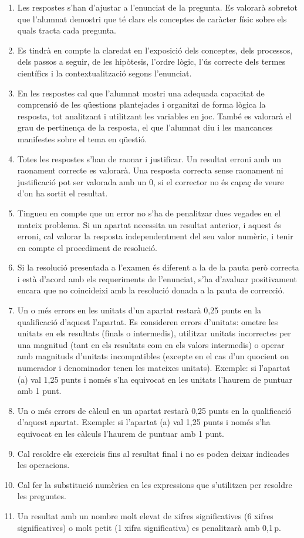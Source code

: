 \begin{enumerate}
  \item Les respostes s'han d'ajustar a l'enunciat de la pregunta. Es valorarà sobretot que l'alumnat demostri que té clars els conceptes de caràcter físic sobre els quals tracta cada pregunta.
  \item Es tindrà en compte la claredat en l'exposició dels conceptes, dels processos, dels passos a seguir, de les hipòtesis, l'ordre lògic, l'ús correcte dels termes científics i la contextualització segons l'enunciat.
  \item En les respostes cal que l'alumnat mostri una adequada capacitat de comprensió de les qüestions plantejades i organitzi de forma lògica la resposta, tot analitzant i utilitzant les variables en joc. També es valorarà el grau de pertinença de la resposta, el que l'alumnat diu i les mancances manifestes sobre el tema en qüestió.
  \item Totes les respostes s'han de raonar i justificar. Un resultat erroni amb un raonament correcte es valorarà. Una resposta correcta sense raonament ni justificació pot ser valorada amb un 0, si el corrector no és capaç de veure d'on ha sortit el resultat.
  \item Tingueu en compte que un error no s'ha de penalitzar dues vegades en el mateix problema. Si un apartat necessita un resultat anterior, i aquest és erroni, cal valorar la resposta independentment del seu valor numèric, i tenir en compte el procediment de resolució.
  \item Si la resolució presentada a l'examen és diferent a la de la pauta però correcta i està d'acord amb els requeriments de l'enunciat, s'ha d'avaluar positivament encara que no coincideixi amb la resolució donada a la pauta de correcció.
  \item Un o més errors en les unitats d'un apartat restarà 0,25 punts en la qualificació d'aquest l'apartat. Es consideren errors d'unitats: ometre les unitats en els resultats (finals o intermedis), utilitzar unitats incorrectes per una magnitud (tant en els resultats com en els valors intermedis) o operar amb magnituds d'unitats incompatibles (excepte en el cas d'un quocient on numerador i denominador tenen les mateixes unitats). Exemple: si l'apartat (a) val 1,25 punts i només s'ha equivocat en les unitats l'haurem de puntuar amb 1 punt.
  \item Un o més errors de càlcul en un apartat restarà 0,25 punts en la qualificació d'aquest apartat. Exemple: si l'apartat (a) val 1,25 punts i només s'ha equivocat en les càlculs l'haurem de puntuar amb 1 punt.
  \item Cal resoldre els exercicis fins al resultat final i no es poden deixar indicades les operacions.
  \item Cal fer la substitució numèrica en les expressions que s'utilitzen per resoldre les preguntes.
  \item Un resultat amb un nombre molt elevat de xifres significatives (6 xifres significatives) o molt petit (1 xifra significativa) es penalitzarà amb 0,1\,p.
\end{enumerate}
